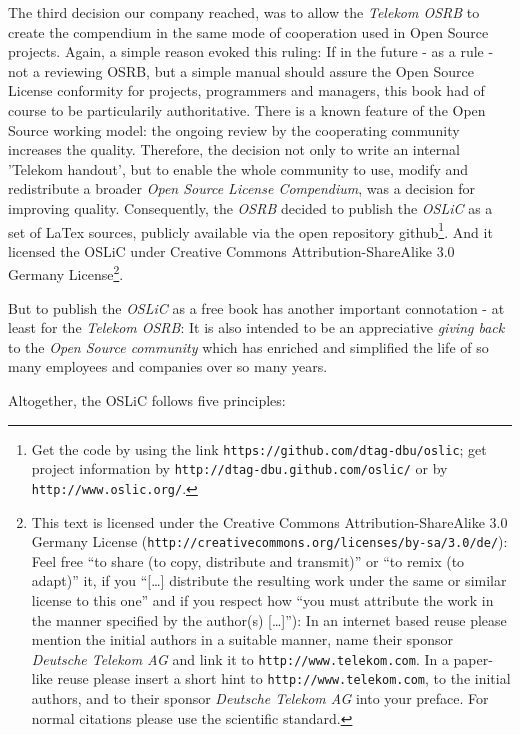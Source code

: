 The third decision our company reached, was to allow the \emph{Telekom OSRB} to
create the compendium in the same mode of cooperation used in Open Source
projects. Again, a simple reason evoked this ruling: If in the future - as a
rule - not a reviewing OSRB, but a simple manual should assure the Open Source
License conformity for projects, programmers and managers, this book had of
course to be particularily authoritative. There is a known feature of the Open
Source working model: the ongoing review by the cooperating community increases
the quality. Therefore, the decision not only to write an internal 'Telekom
handout', but to enable the whole community to use, modify and redistribute a
broader \emph{Open Source License Compendium}, was a decision for improving
quality. Consequently, the \emph{OSRB} decided to publish the \emph{OSLiC} as a
set of LaTex sources, publicly available via the open repository
github\footnote{Get the code by using the link
\texttt{https://github.com/dtag-dbu/oslic}; get project information by
\texttt{http://dtag-dbu.github.com/oslic/} or by
\texttt{http://www.oslic.org/}.}. And it licensed the OSLiC under Creative
Commons Attribution-ShareAlike 3.0 Germany License\footnote{ This text is
licensed under the Creative Commons Attribution-ShareAlike 3.0 Germany License
(\texttt{http://creativecommons.org/licenses/by-sa/3.0/de/}): Feel free
\enquote{to share (to copy, distribute and transmit)} or \enquote{to remix (to
adapt)} it, if you \enquote{[\ldots] distribute the resulting work under the
same or similar license to this one} and if you respect how \enquote{you must
attribute the work in the manner specified by the author(s) [\ldots]}):
In an internet based reuse please mention the initial authors in a suitable
manner, name their sponsor \textit{Deutsche Telekom AG} and link it to
\texttt{http://www.telekom.com}. In a paper-like reuse please insert a short
hint to \texttt{http://www.telekom.com}, to the initial authors, and to their
sponsor \textit{Deutsche Telekom AG} into your preface. For normal citations
please use the scientific standard.}.

But to publish the \emph{OSLiC} as a free book has another important connotation -
at least for the \emph{Telekom OSRB}: It is also intended to be an appreciative
\emph{giving back} to the \emph{Open Source community} which has enriched and
simplified the life of so many employees and companies over so many years.

Altogether, the OSLiC follows five principles:

